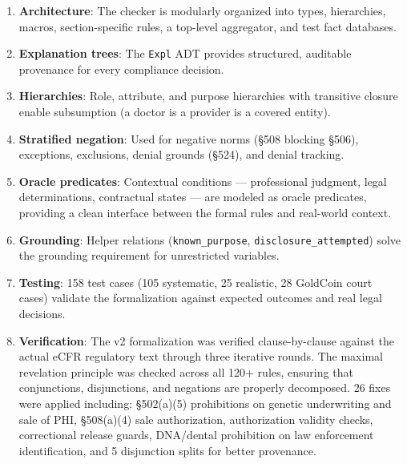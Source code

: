 \documentclass[11pt,letterpaper]{article}
\begin{document}
\begin{enumerate}
  \item \textbf{Architecture}: The checker is modularly organized into types, hierarchies, macros, section-specific rules, a top-level aggregator, and test fact databases.

  \item \textbf{Explanation trees}: The \texttt{Expl} ADT provides structured, auditable provenance for every compliance decision.

  \item \textbf{Hierarchies}: Role, attribute, and purpose hierarchies with transitive closure enable subsumption (a doctor is a provider is a covered entity).

  \item \textbf{Stratified negation}: Used for negative norms (\S 508 blocking \S 506), exceptions, exclusions, denial grounds (\S 524), and denial tracking.

  \item \textbf{Oracle predicates}: Contextual conditions --- professional judgment, legal determinations, contractual states --- are modeled as oracle predicates, providing a clean interface between the formal rules and real-world context.

  \item \textbf{Grounding}: Helper relations (\texttt{known\_purpose}, \texttt{disclosure\_attempted}) solve the grounding requirement for unrestricted variables.

  \item \textbf{Testing}: 158 test cases (105 systematic, 25 realistic, 28 GoldCoin court cases) validate the formalization against expected outcomes and real legal decisions.

  \item \textbf{Verification}: The v2 formalization was verified clause-by-clause against the actual eCFR regulatory text through three iterative rounds. The maximal revelation principle was checked across all 120+ rules, ensuring that conjunctions, disjunctions, and negations are properly decomposed. 26 fixes were applied including: \S 502(a)(5) prohibitions on genetic underwriting and sale of PHI, \S 508(a)(4) sale authorization, authorization validity checks, correctional release guards, DNA/dental prohibition on law enforcement identification, and 5 disjunction splits for better provenance.
\end{enumerate}
\end{document}
